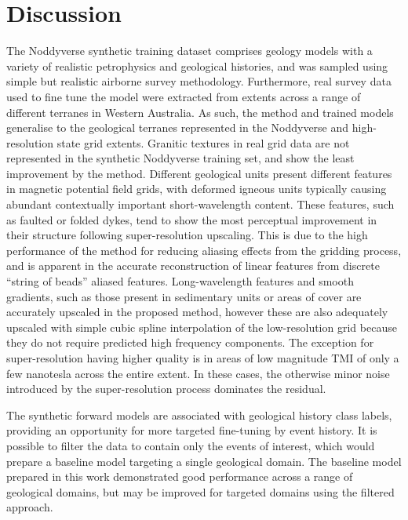 \section{Discussion}
\label{sec:2discussion}
The Noddyverse synthetic training dataset comprises geology models with a variety of realistic petrophysics and geological histories, and was sampled using simple but realistic airborne survey methodology.
Furthermore, real survey data used to fine tune the model were extracted from extents across a range of different terranes in Western Australia.
As such, the method and trained models generalise to the geological terranes represented in the Noddyverse and high-resolution state grid extents.
Granitic textures in real grid data are not represented in the synthetic Noddyverse training set, and show the least improvement by the method.
Different geological units present different features in magnetic potential field grids, with deformed igneous units typically causing abundant contextually important short-wavelength content.
These features, such as faulted or folded dykes, tend to show the most perceptual improvement in their structure following super-resolution upscaling.
This is due to the high performance of the method for reducing aliasing effects from the gridding process, and is apparent in the accurate reconstruction of linear features from discrete “string of beads” aliased features.
Long-wavelength features and smooth gradients, such as those present in sedimentary units or areas of cover are accurately upscaled in the proposed method, however these are also adequately upscaled with simple cubic spline interpolation of the low-resolution grid because they do not require predicted high frequency components.
The exception for super-resolution having higher quality is in areas of low magnitude TMI of only a few nanotesla across the entire extent.
In these cases, the otherwise minor noise introduced by the super-resolution process dominates the residual.

The synthetic forward models are associated with geological history class labels, providing an opportunity for more targeted fine-tuning by event history.
It is possible to filter the data to contain only the events of interest, which would prepare a baseline model targeting a single geological domain.
The baseline model prepared in this work demonstrated good performance across a range of geological domains, but may be improved for targeted domains using the filtered approach.

